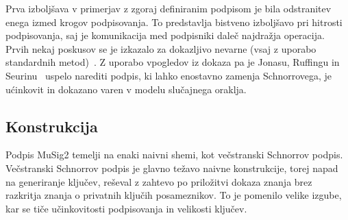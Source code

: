 \documentclass[isrm2, tisk]{fmfdelo}
\begin{document}
Prva izboljšava v primerjav z zgoraj definiranim podpisom je bila odstranitev enega izmed krogov
podpisovanja. To predstavlja bistveno izboljšavo pri hitrosti podpisovanja, saj je komunikacija
med podpisniki daleč najdražja operacija. Prvih nekaj poskusov se je izkazalo za dokazljivo nevarne
(vsaj z uporabo standardnih metod)~\cite{drijvers2019security}. Z uporabo vpogledov iz dokaza pa je 
Jonasu, Ruffingu in Seurinu~\cite{jonas2020musig2} uspelo narediti podpis, ki lahko enostavno zamenja
Schnorrovega, je ućinkovit in dokazano varen v modelu slučajnega oraklja.

\subsection{Konstrukcija}
Podpis MuSig2 temelji na enaki naivni shemi, kot večstranski Schnorrov podpis. Večstranski Schnorrov
podpis je glavno težavo naivne konstrukcije, torej napad na generiranje ključev, reševal z zahtevo
po priložitvi dokaza znanja brez razkritja znanja o privatnih ključih posameznikov. To je pomenilo
velike izgube, kar se tiče učinkovitosti podpisovanja in velikosti ključev.
\end{document}
